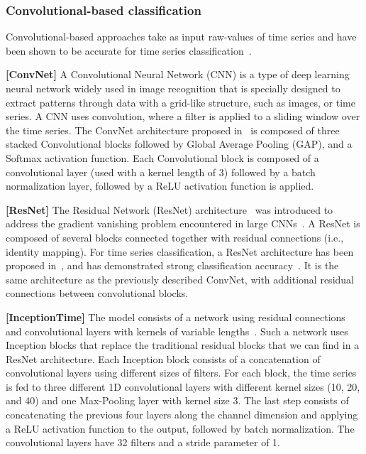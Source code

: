 \vspace{-0.1cm}
\subsubsection{Convolutional-based classification}

Convolutional-based approaches take as input raw-values of time series and have been shown to be accurate for time series classification~\cite{DBLP:conf/sigmod/BoniolMRP22}.

\noindent\textbf{[ConvNet]}
A Convolutional Neural Network (CNN) \cite{DBLP:journals/corr/OSheaN15} is a type of deep learning neural network widely used in image recognition that is specially designed to extract patterns through data with a grid-like structure, such as images, or time series. A CNN uses convolution, where a filter is applied to a sliding window over the time series. The ConvNet architecture proposed in~\cite{DBLP:journals/corr/WangYO16} is composed of three stacked Convolutional blocks followed by Global Average Pooling (GAP), and a Softmax activation function. Each Convolutional block is composed of a convolutional layer (used with a kernel length of $3$) followed by a batch normalization layer, followed by a ReLU activation function is applied.

\noindent\textbf{[ResNet]}
The Residual Network (ResNet) architecture~\cite{https://doi.org/10.48550/arxiv.1512.03385} was introduced to address the gradient vanishing problem encountered in large CNNs~\cite{simonyan2015a}. A ResNet is composed of several blocks connected together with residual connections (i.e., identity mapping). For time series classification, a ResNet architecture has been proposed in~\cite{DBLP:journals/corr/WangYO16}, and has demonstrated strong classification accuracy~\cite{fawaz2019deep}. It is the same architecture as the previously described ConvNet, with additional residual connections between convolutional blocks.

\noindent\textbf{[InceptionTime]}
The model consists of a network using residual connections and convolutional layers with kernels of variable lengths~\cite{fawaz2020inceptiontime}. Such a network uses  Inception blocks that replace the traditional residual blocks that we can find in a ResNet architecture. Each Inception block consists of a concatenation of convolutional layers using different sizes of filters. For each block, the time series is fed to three different 1D convolutional layers with different kernel sizes (10, 20, and 40) and one Max-Pooling layer with kernel size 3. The last step consists of concatenating the previous four layers along the channel dimension and applying a ReLU activation function to the output, followed by batch normalization. The convolutional layers have 32 filters and a stride parameter of 1.

